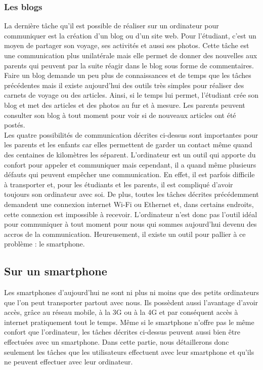 \documentclass[12pt]{article}
\begin{document}
\subsubsection{Les blogs}
La dernière tâche qu'il est possible de réaliser sur un ordinateur pour communiquer est la création d'un blog ou d'un site web. Pour l'étudiant, c'est un moyen de partager son voyage, ses activités et aussi ses photos. Cette tâche est une communication plus unilatérale mais elle permet de donner des nouvelles aux parents qui peuvent par la suite réagir dans le blog sous forme de commentaires. Faire un blog demande  un peu plus de connaissances et de temps que les tâches précédentes mais il existe aujourd'hui des outils très simples pour réaliser des carnets de voyage ou des articles. Ainsi, si le temps lui permet, l'étudiant crée son blog et met des articles et des photos au fur et à mesure. Les parents peuvent consulter son blog à tout moment pour voir si de nouveaux articles ont été postés. ~\\

Les quatre possibilités de communication décrites ci-dessus sont importantes pour les parents et les enfants car elles permettent de garder un contact même quand des centaines de kilomètres les séparent. L'ordinateur est un outil qui apporte du confort pour appeler et communiquer mais cependant, il a quand même plusieurs défauts qui peuvent empêcher une communication. En effet, il est parfois difficile à transporter et, pour les étudiants et les parents, il est compliqué d'avoir toujours son ordinateur avec soi. De plus, toutes les tâches décrites précédemment demandent une connexion internet Wi-Fi ou Ethernet et, dans certains endroits, cette connexion est impossible à recevoir. L'ordinateur n'est donc pas l'outil idéal pour communiquer à tout moment pour nous qui sommes aujourd'hui devenu des accros de la communication. Heureusement, il existe un outil pour pallier à ce problème : le smartphone.

\subsection{Sur un smartphone}
Les smartphones d'aujourd'hui ne sont ni plus ni moins que des petits ordinateurs que l'on peut transporter partout avec nous. Ils possèdent aussi l'avantage d'avoir accès, grâce au réseau mobile, à la 3G ou à la 4G et par conséquent accès à internet pratiquement tout le temps. Même si le smartphone n'offre pas le même confort que l'ordinateur, les tâches décrites ci-dessus peuvent aussi bien être effectuées avec un smartphone. Dans cette partie, nous détaillerons donc seulement les tâches que les utilisateurs effectuent avec leur smartphone et qu'ils ne peuvent effectuer avec leur ordinateur. ~\\
\end{document}

